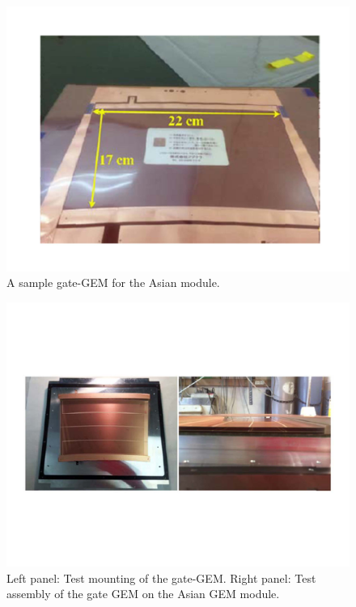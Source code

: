 
\begin{figure}[htb!]
\begin{center}
\includegraphics[width=\columnwidth]{plots/TPC-Gate_Fig6gating.pdf}%
\caption{\label{Fig6gating} {A sample gate-GEM for the Asian module.}}
\end{center}
\end{figure}


\begin{figure}[htb!]
\begin{center}
\includegraphics[width=\columnwidth]{plots/TPC-Gate_Fig78gating.pdf}%
\caption{\label{Fig78gating} {Left panel: Test mounting of the gate-GEM. Right panel: Test assembly of the gate GEM on the Asian GEM module.}}
\end{center}
\end{figure}

